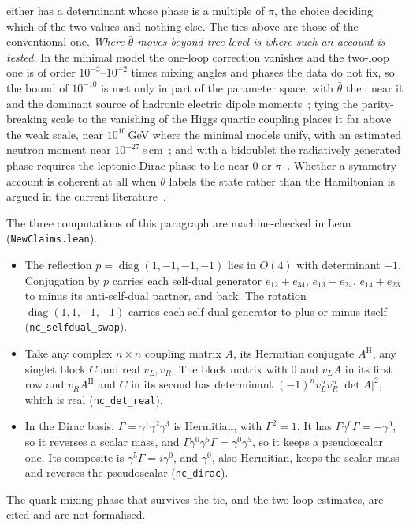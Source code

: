 \documentclass[11pt]{article}
\begin{document}
either has a determinant whose phase is a multiple of $\pi$, the choice deciding which of the two values and nothing else. The ties above are those of the conventional one. \emph{Where $\bar\theta$ moves beyond tree level is where such an account is tested.} In the minimal model the one-loop correction vanishes and the two-loop one is of order $10^{-3}$--$10^{-2}$ times mixing angles and phases the data do not fix, so the bound of $10^{-10}$ is met only in part of the parameter space, with $\bar\theta$ then near it and the dominant source of hadronic electric dipole moments~\cite{BabuMohapatra1990,deVriesDraperPatel2021}; tying the parity-breaking scale to the vanishing of the Higgs quartic coupling places it far above the weak scale, near $10^{10}$\,GeV where the minimal models unify, with an estimated neutron moment near $10^{-27}\,e$\,cm~\cite{HallHarigaya2018}; and with a bidoublet the radiatively generated phase requires the leptonic Dirac phase to lie near $0$ or $\pi$~\cite{Kuchimanchi2025}. Whether a symmetry account is coherent at all when $\theta$ labels the state rather than the Hamiltonian is argued in the current literature~\cite{KaplanMeliaRajendran2025,Kuchimanchi2025}. 

The three computations of this paragraph are machine-checked in Lean (\texttt{NewClaims.lean}).
\begin{itemize}
\item The reflection $p=\operatorname{diag}(1,-1,-1,-1)$ lies in $O(4)$ with determinant $-1$. Conjugation by $p$ carries each self-dual generator $e_{12}+e_{34}$, $e_{13}-e_{24}$, $e_{14}+e_{23}$ to minus its anti-self-dual partner, and back. The rotation $\operatorname{diag}(1,1,-1,-1)$ carries each self-dual generator to plus or minus itself (\texttt{nc\_selfdual\_swap}).
\item Take any complex $n\times n$ coupling matrix $A$, its Hermitian conjugate $A^{\mathrm{H}}$, any singlet block $C$ and real $v_{L},v_{R}$. The block matrix with $0$ and $v_{L}A$ in its first row and $v_{R}A^{\mathrm{H}}$ and $C$ in its second has determinant $(-1)^{n}v_{L}^{n}v_{R}^{n}\lvert\det A\rvert^{2}$, which is real (\texttt{nc\_det\_real}).
\item In the Dirac basis, $\Gamma=\gamma^{1}\gamma^{2}\gamma^{3}$ is Hermitian, with $\Gamma^{2}=1$. It has $\Gamma\gamma^{0}\Gamma=-\gamma^{0}$, so it reverses a scalar mass, and $\Gamma\gamma^{0}\gamma^{5}\Gamma=\gamma^{0}\gamma^{5}$, so it keeps a pseudoscalar one. Its composite is $\gamma^{5}\Gamma=i\gamma^{0}$, and $\gamma^{0}$, also Hermitian, keeps the scalar mass and reverses the pseudoscalar (\texttt{nc\_dirac}).
\end{itemize}
The quark mixing phase that survives the tie, and the two-loop estimates, are cited and are not formalised.
\end{document}
